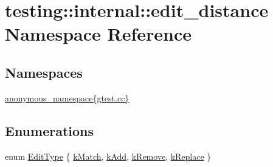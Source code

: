 \hypertarget{namespacetesting_1_1internal_1_1edit__distance}{}\section{testing\+:\+:internal\+:\+:edit\+\_\+distance Namespace Reference}
\label{namespacetesting_1_1internal_1_1edit__distance}
\subsection*{Namespaces}
\begin{DoxyCompactItemize}
\item 
 \hyperlink{namespacetesting_1_1internal_1_1edit__distance_1_1anonymous__namespace_02gtest_8cc_03}{anonymous\+\_\+namespace\{gtest.\+cc\}}
\end{DoxyCompactItemize}
\subsection*{Enumerations}
\begin{DoxyCompactItemize}
\item 
enum \hyperlink{namespacetesting_1_1internal_1_1edit__distance_ad46aa6da12aec1a3f166310478b53a08}{Edit\+Type} \{ \hyperlink{namespacetesting_1_1internal_1_1edit__distance_ad46aa6da12aec1a3f166310478b53a08a7bdb9c74613a94f21b7489e0b5640a63}{k\+Match}, 
\hyperlink{namespacetesting_1_1internal_1_1edit__distance_ad46aa6da12aec1a3f166310478b53a08a63400b073f5b311a87d568b5ae27ffe8}{k\+Add}, 
\hyperlink{namespacetesting_1_1internal_1_1edit__distance_ad46aa6da12aec1a3f166310478b53a08a814768ef6cd0264a0a10b1e701a63e78}{k\+Remove}, 
\hyperlink{namespacetesting_1_1internal_1_1edit__distance_ad46aa6da12aec1a3f166310478b53a08afdbf30ecf9f32f60c646a34a358615f2}{k\+Replace}
 \}
\end{DoxyCompactItemize}
